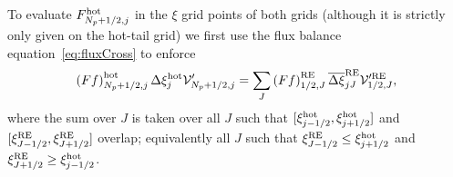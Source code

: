 \documentclass{notes}
\newcommand{\Vp}{\mathcal{V}'}
\begin{document}
    To evaluate $F^{\rm hot}_{N_p+1/2,j}$ in the $\xi$ grid points of both grids
    (although it is strictly only given on the hot-tail grid) we first use the
    flux balance equation~\eqref{eq:fluxCross} to enforce
    \begin{equation}\label{eq:fluxBalance2}
        \left( F f \right)^{\rm hot}_{N_p+1/2,j} \Delta\xi^{\rm hot}_j\Vp_{N_p+1/2,j} =
        \sum_J \left( F f \right)^{\rm RE}_{1/2,J} \overline{\Delta\xi}^{\rm RE}_{jJ}\Vp^{\rm RE}_{1/2,J},
    \end{equation}
    where the sum over $J$ is taken over all $J$ such that
    $[\xi_{j-1/2}^{\rm hot}, \xi_{j+1/2}^{\rm hot}]$ and $[\xi_{J-1/2}^{\rm RE},\xi_{J+1/2}^{\rm RE}]$
    overlap; equivalently all $J$ such that $\xi^{\rm RE}_{J-1/2}\leq\xi^{\rm hot}_{j+1/2}$
    and $\xi^{\rm RE}_{J+1/2}\geq\xi^{\rm hot}_{j-1/2}$.
\end{document}
